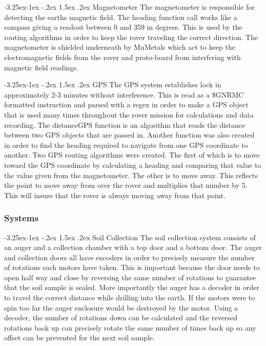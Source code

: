 \documentclass[onecolumn, draftclsnofoot, 10pt, compsoc]{IEEEtran}
\makeatletter
\renewcommand\paragraph{\@startsection{paragraph}{4}{\z@}%
                                     {-3.25ex\@plus -1ex \@minus -.2ex}%
                                     {1.5ex \@plus .2ex}%
                                     {\normalfont\normalsize\bfseries}}
\makeatother
\begin{document}
\paragraph{Magnetometer}
The magnetometer is responsible for detecting the earths magnetic field. The heading function call works like a compass giving a readout between 0 and 359 in degrees. This is used by the routing algorithms in order to keep the rover traveling the correct direction. The magnetometer is shielded underneath by MuMetals which act to keep the electromagnetic fields from the rover and proto-board from interfering with magnetic field readings. 

\paragraph{GPS}
The GPS system establishes lock in approximately 2-3 minutes without interference. This is read as a \$GNRMC formatted instruction and parsed with a regex in order to make a GPS object that is used many times throughout the rover mission for calculations and data recording. The distanceGPS function is an algorithm that reads the distance between two GPS objects that are passed in. Another function was also created in order to find the heading required to navigate from one GPS coordinate to another. Two GPS routing algorithms were created. The first of which is to move toward the GPS coordinate by calculating a heading and comparing that value to the value given from the magnetometer. The other is to move away. This reflects the point to move away from over the rover and multiplies that number by 5. This will insure that the rover is always moving away from that point. 

\subsubsection{Systems}
\paragraph{Soil Collection}
The soil collection system consists of an auger and a collection chamber with a top door and a bottom door. The auger and collection doors all have encoders in order to precisely measure the number of rotations each motors have taken. This is important because the door needs to open half way and close by reversing the same number of rotations to guarantee that the soil sample is sealed. More importantly the auger has a decoder in order to travel the correct distance while drilling into the earth. If the motors were to spin too far the auger enclosure would be destroyed by the motor. Using a decoder, the number of rotations down can be calculated and the reversed rotations back up can precisely rotate the same number of times back up so any offset can be prevented for the next soil sample. 
\end{document}
